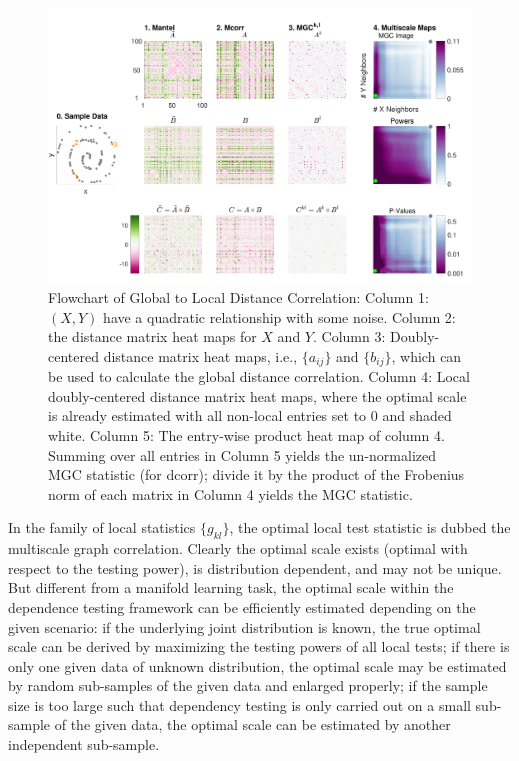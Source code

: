 \documentclass[11pt]{article}
\begin{document}
\begin{figure}[htbp]
\includegraphics[width=1.0\textwidth]{../Figures/FigA}
\caption{
Flowchart of Global to Local Distance Correlation: Column 1: $(X,Y)$ have a quadratic relationship with some noise. Column 2: the distance matrix heat maps for $X$ and $Y$. Column 3: Doubly-centered distance matrix heat maps, i.e., $\{a_{ij}\}$ and $\{b_{ij}\}$, which can be used to calculate the global distance correlation. Column 4: Local doubly-centered distance matrix heat maps, where the optimal scale is already estimated with all non-local entries set to $0$ and shaded white. Column 5: The entry-wise product heat map of column 4. Summing over all entries in Column 5 yields the un-normalized MGC statistic (for dcorr); divide it by the product of the Frobenius norm of each matrix in Column 4 yields the MGC statistic. }
\label{fig:A}
\end{figure}

In the family of local statistics $\{g_{kl}\}$, the optimal local test statistic is dubbed the multiscale graph correlation. Clearly the optimal scale exists (optimal with respect to the testing power), is distribution dependent, and may not be unique. But different from a manifold learning task, the optimal scale within the dependence testing framework can be efficiently estimated depending on the given scenario: if the underlying joint distribution is known, the true optimal scale can be derived by maximizing the testing powers of all local tests; if there is only one given data of unknown distribution, the optimal scale may be estimated by random sub-samples of the given data and enlarged properly; if the sample size is too large such that dependency testing is only carried out on a small sub-sample of the given data, the optimal scale can be estimated by another independent sub-sample. 
\end{document}

